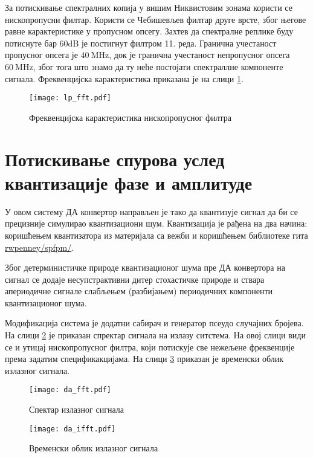 \documentclass[conference]{IEEEJERM}
\begin{document}
За потискивање спектралних копија у вишим Никвистовим зонама користи се нископропусни филтар.
Користи се Чебишевљев филтар друге врсте, због његове равне карактеристике у пропусном опсегу.
Захтев да спектралне реплике буду потиснуте бар 60dB је постигнут филтром 11. реда. 
Гранична учестаност пропусног опсега је $\SI{40}{\mega\hertz}$, док је гранична учестаност непропусног опсега $\SI{60}{\mega\hertz}$, 
због тога што знамо да ту неће постојати спектраллне компоненте сигнала. Фреквенцијска карактеристика приказана је на слици \ref{fig:lp}.

\begin{figure}[t]
  \centering
  \texttt{[image: lp\_fft.pdf]}
  \caption{Фреквенцијска карактеристика нископропусног филтра}
  \label{fig:lp}
\end{figure}

\section{Потискивање спурова услед квантизације фазе и амплитуде}

У овом систему ДА конвертор направљен је тако да квантизује сигнал да би се прецизније симулирао квантизациони шум.
Квантизација је рађена на два начина: коришћењем квантизатора из материјала са вежби и коришћењем библиотеке гита \href{https://github.com/rwpenney/spfpm/}{rwpenney/spfpm/}.

Због детерминистичке природе квантизационог шума пре ДА конвертора на сигнал се додаје несупстрактивни дитер стохастичке природе и ствара апериодичне сигнале слабљењем (разбијањем) периодичних компоненти квантизационог шума.

Модификација система је додатни сабирач и генератор псеудо случајних бројева. На слици \ref{fig:da_fft} је приказан спректар сигнала на излазу ситстема.
На овој слици види се и утицај нископропусног филтра, који потискује све нежељене фреквенције према задатим спецификакцијама. 
На слици \ref{fig:da_ifft} приказан је временски облик излазног сигнала.

\begin{figure}[t]
	\centering
	\texttt{[image: da\_fft.pdf]}
	\caption{Спектар излазног сигнала}
	\label{fig:da_fft}
\end{figure}

\begin{figure}[t]
	\centering
	\texttt{[image: da\_ifft.pdf]}
	\caption{Временски облик излазног сигнала}
	\label{fig:da_ifft}
\end{figure}
\end{document}

